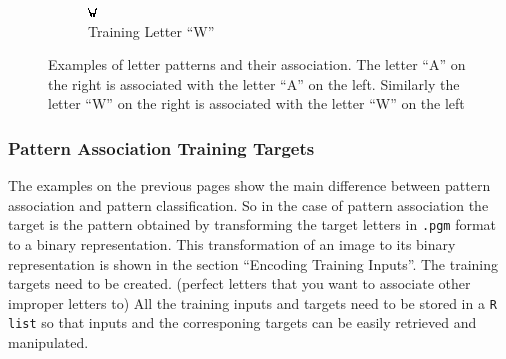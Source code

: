\documentclass[a4paper,12pt]{report}
\begin{document}
\begin{figure}
\begin{subfigure}[h!]{0.3\textwidth}
        \end{subfigure}
        \quad \quad \quad \quad \quad \quad
        \begin{subfigure}[h!]{0.3\textwidth}
                \includegraphics[width=\textwidth]{W1.png}
                \caption{Training Letter ``W''}
                
        \end{subfigure}
        \caption{Examples of letter patterns and their association. The letter ``A'' on the right is associated with the letter ``A'' on the left. Similarly the letter ``W'' on the right is associated with the letter ``W'' on the left}
\end{figure}

\clearpage

\subsubsection*{Pattern Association Training Targets}
The examples on the previous pages show the main difference between pattern association and pattern classification. So in the case of pattern 
association the target is the pattern obtained by transforming the target letters in \verb+.pgm+ format to a binary representation. This transformation of an image to 
its binary representation is shown in the section ``Encoding Training Inputs''. The training targets need to be created. (perfect letters that you want to associate other improper letters to)
All the training inputs and targets need to be stored in a \verb+R list+ so that inputs and the corresponing targets can be easily retrieved and manipulated.
\end{document}
